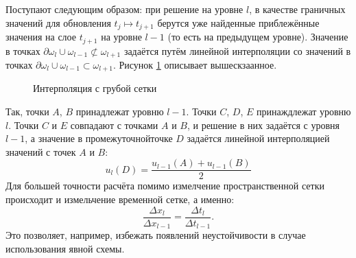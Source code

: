 Поступают следующим образом: при решение на уровне $l$, в качестве граничных значений для обновления $t_j \mapsto t_{j + 1}$ берутся уже найденные приблежённые значения на слое $t_{j + 1}$ на уровне $l - 1$ (то есть на предыдущем уровне).
Значение в точках $\partial \omega_l \cup \omega_{l - 1} \not\subset \omega_{l + 1}$ задаётся путём линейной интерполяции со значений в точках $\partial \omega_l \cup \omega_{l - 1} \subset \omega_{l + 1}$.
Рисунок \ref{fig:linear_interpolation} описывает вышескзаанное.
\begin{figure}[h]
    \centering
    \caption{Интерполяция с грубой сетки}
    \label{fig:linear_interpolation}
\end{figure}
Так, точки $A$, $B$ принадлежат уровню $l - 1$.
Точки $C$, $D$, $E$ принаждлежат уровню $l$.
Точки $C$ и $E$ совпадают с точками $A$ и $B$, и решение в них задаётся с уровня $l - 1$, а значение в \glqq промежуточной\grqq точке $D$ задаётся линейной интерполяцией значений с точек $A$ и $B$:
\begin{equation*}
    u_l(D) = \frac{u_{l - 1}(A) + u_{l - 1}(B)}{2}
\end{equation*}
Для большей точности расчёта помимо измелчение пространственной сетки происходит и измельчение временной сетке, а именно:
\begin{equation*}
    \frac{\Delta x_{l}}{\Delta x_{l - 1}} = \frac{\Delta t_{l}}{\Delta t_{l - 1}}.
\end{equation*}
Это позволяет, например, избежать появлений неустойчивости в случае использования явной схемы.